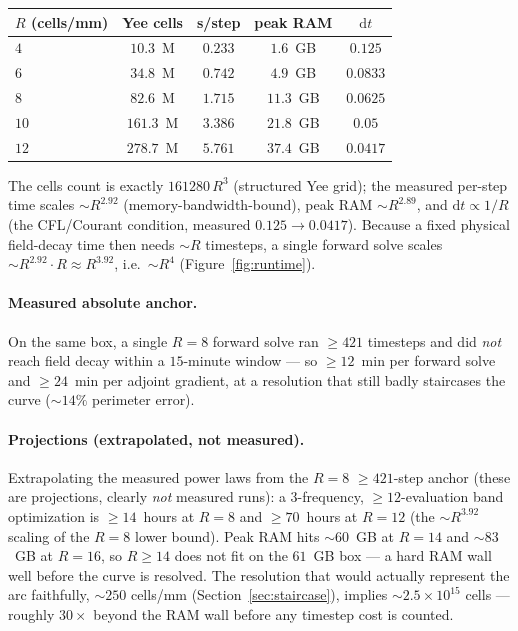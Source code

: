 \documentclass{anvil-paper}
\begin{document}
\begin{center}
\begin{tabular}{lcccc}
\toprule
$R$ (cells/mm) & Yee cells & s/step & peak RAM & $\mathrm{d}t$ \\
\midrule
$4$  & $10.3$~M  & $0.233$ & $1.6$~GB  & $0.125$ \\
$6$  & $34.8$~M  & $0.742$ & $4.9$~GB  & $0.0833$ \\
$8$  & $82.6$~M  & $1.715$ & $11.3$~GB & $0.0625$ \\
$10$ & $161.3$~M & $3.386$ & $21.8$~GB & $0.05$ \\
$12$ & $278.7$~M & $5.761$ & $37.4$~GB & $0.0417$ \\
\bottomrule
\end{tabular}
\end{center}

The cells count is exactly $161280\,R^3$ (structured Yee grid); the measured
per-step time scales $\sim\!R^{2.92}$ (memory-bandwidth-bound), peak RAM
$\sim\!R^{2.89}$, and $\mathrm{d}t \propto 1/R$ (the CFL/Courant condition,
measured $0.125\!\to\!0.0417$). Because a fixed physical field-decay time then
needs $\sim\!R$ timesteps, a single forward solve scales
$\sim\!R^{2.92}\cdot R \approx R^{3.92}$, i.e.\ $\sim\!R^4$
(Figure~\ref{fig:runtime}).

\paragraph{Measured absolute anchor.}
On the same box, a single $R=8$ forward solve ran $\ge\!421$ timesteps and did
\emph{not} reach field decay within a $15$-minute window --- so
$\ge\!12$~min per forward solve and $\ge\!24$~min per adjoint gradient, at a
resolution that still badly staircases the curve ($\sim\!14\%$ perimeter error).

\paragraph{Projections (extrapolated, not measured).}
Extrapolating the measured power laws from the $R=8$ $\ge\!421$-step anchor
(these are projections, clearly \emph{not} measured runs): a $3$-frequency,
$\ge\!12$-evaluation band optimization is $\ge\!14$~hours at $R=8$ and
$\ge\!70$~hours at $R=12$ (the $\sim\!R^{3.92}$ scaling of the $R=8$ lower
bound). Peak RAM hits $\sim\!60$~GB at $R=14$ and $\sim\!83$~GB at $R=16$, so
$R\!\ge\!14$ does not fit on the $61$~GB box --- a hard RAM wall well before the
curve is resolved. The resolution that would actually represent the arc
faithfully, $\sim\!250$ cells/mm (Section~\ref{sec:staircase}), implies
$\sim\!2.5\times10^{15}$ cells --- roughly $30\times$ beyond the RAM wall before
any timestep cost is counted.
\end{document}
